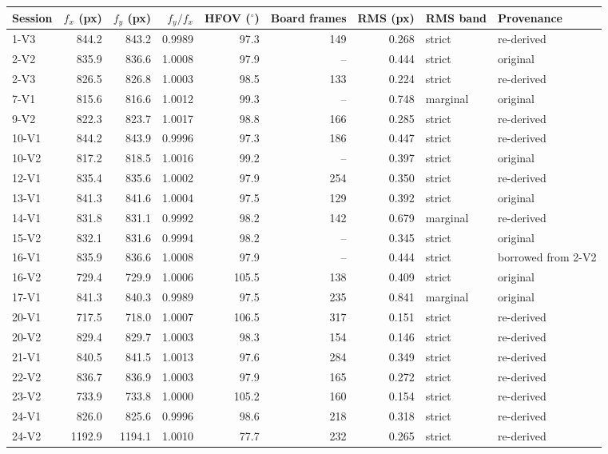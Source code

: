 \begin{tabular}{lrrrrrrll}
\toprule
Session & $f_x$ (px) & $f_y$ (px) & $f_y/f_x$ & HFOV ($^\circ$) & Board frames & RMS (px) & RMS band & Provenance \\
\midrule
1-V3 & 844.2 & 843.2 & 0.9989 & 97.3 & 149 & 0.268 & strict & re-derived \\
2-V2 & 835.9 & 836.6 & 1.0008 & 97.9 & -- & 0.444 & strict & original \\
2-V3 & 826.5 & 826.8 & 1.0003 & 98.5 & 133 & 0.224 & strict & re-derived \\
7-V1 & 815.6 & 816.6 & 1.0012 & 99.3 & -- & 0.748 & marginal & original \\
9-V2 & 822.3 & 823.7 & 1.0017 & 98.8 & 166 & 0.285 & strict & re-derived \\
10-V1 & 844.2 & 843.9 & 0.9996 & 97.3 & 186 & 0.447 & strict & re-derived \\
10-V2 & 817.2 & 818.5 & 1.0016 & 99.2 & -- & 0.397 & strict & original \\
12-V1 & 835.4 & 835.6 & 1.0002 & 97.9 & 254 & 0.350 & strict & re-derived \\
13-V1 & 841.3 & 841.6 & 1.0004 & 97.5 & 129 & 0.392 & strict & original \\
14-V1 & 831.8 & 831.1 & 0.9992 & 98.2 & 142 & 0.679 & marginal & re-derived \\
15-V2 & 832.1 & 831.6 & 0.9994 & 98.2 & -- & 0.345 & strict & original \\
16-V1 & 835.9 & 836.6 & 1.0008 & 97.9 & -- & 0.444 & strict & borrowed from 2-V2 \\
16-V2 & 729.4 & 729.9 & 1.0006 & 105.5 & 138 & 0.409 & strict & original \\
17-V1 & 841.3 & 840.3 & 0.9989 & 97.5 & 235 & 0.841 & marginal & original \\
20-V1 & 717.5 & 718.0 & 1.0007 & 106.5 & 317 & 0.151 & strict & re-derived \\
20-V2 & 829.4 & 829.7 & 1.0003 & 98.3 & 154 & 0.146 & strict & re-derived \\
21-V1 & 840.5 & 841.5 & 1.0013 & 97.6 & 284 & 0.349 & strict & re-derived \\
22-V2 & 836.7 & 836.9 & 1.0003 & 97.9 & 165 & 0.272 & strict & re-derived \\
23-V2 & 733.9 & 733.8 & 1.0000 & 105.2 & 160 & 0.154 & strict & re-derived \\
24-V1 & 826.0 & 825.6 & 0.9996 & 98.6 & 218 & 0.318 & strict & re-derived \\
24-V2 & 1192.9 & 1194.1 & 1.0010 & 77.7 & 232 & 0.265 & strict & re-derived \\

\end{tabular}
